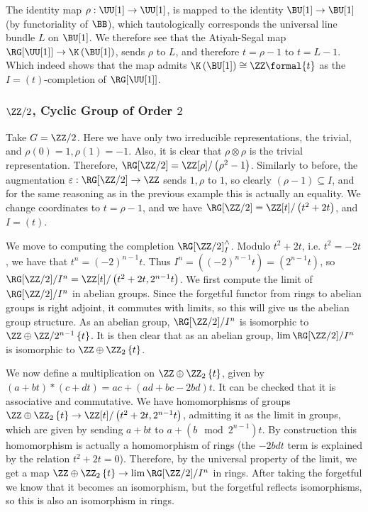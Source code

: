 The identity map $\rho: \UU[1] \to \UU[1]$, is mapped to the identity $\BU[1] \to \BU[1]$ (by functoriality of $\BB$), which tautologically corresponds the universal line bundle $L$ on $\BU[1]$.
We therefore see that the Atiyah-Segal map $\RG[\UU[1]] \to \K\left(\BU[1]\right)$, sends $\rho$ to $L$, and therefore $t = \rho - 1$ to $t = L - 1$.
Which indeed shows that the map admits $\K\left(\BU[1]\right) \cong \ZZ\formal{t}$ as the $I = \left(t\right)$-completion of $\RG[\UU[1]]$.


\subsubsection{\texorpdfstring{$\ZZ/2$}{Z/2}, Cyclic Group of Order \texorpdfstring{$2$}{2}}

Take $G = \ZZ/2$.
Here we have only two irreducible representations, the trivial, and $\rho\left(0\right) = 1, \rho\left(1\right) = -1$.
Also, it is clear that $\rho \otimes \rho$ is the trivial representation.
Therefore, $\RG[\ZZ/2] = \ZZ[\rho]/\left(\rho^2-1\right)$.
Similarly to before, the augmentation $\varepsilon: \RG[\ZZ/2] \to \ZZ$ sends $1,\rho$ to $1$, so clearly $\left(\rho-1\right) \subseteq I$, and for the same reasoning as in the previous example this is actually an equality.
We change coordinates to $t = \rho-1$, and we have $\RG[\ZZ/2] = \ZZ[t]/\left(t^2+2t\right)$, and $I = \left(t\right)$.

We move to computing the completion $\RG[\ZZ/2]_I^\wedge$.
Modulo $t^2+2t$, i.e. $t^2 = -2t$, we have that $t^n = \left(-2\right)^{n-1} t$.
Thus $I^n = \left(\left(-2\right)^{n-1} t\right) = \left(2^{n-1} t\right)$, so $\RG[\ZZ/2]/I^n = \ZZ[t]/\left(t^2+2t, 2^{n-1} t\right)$.
We first compute the limit of $\RG[\ZZ/2]/I^n$ in abelian groups.
Since the forgetful functor from rings to abelian groups is right adjoint, it commutes with limits, so this will give us the abelian group structure.
As an abelian group, $\RG[\ZZ/2]/I^n$ is isomorphic to $\ZZ \oplus \ZZ/2^{n-1}\left\{t\right\}$.
It is then clear that as an abelian group, $\lim \RG[\ZZ/2]/I^n$ is isomorphic to $\ZZ \oplus \ZZ_2\left\{t\right\}$.

We now define a multiplication on $\ZZ \oplus \ZZ_2\left\{t\right\}$, given by $\left(a+bt\right) * \left(c+dt\right) = ac + (ad+bc-2bd)t$.
It can be checked that it is associative and commutative.
We have homomorphisms of groups $\ZZ \oplus \ZZ_2\left\{t\right\} \to \ZZ[t]/\left(t^2+2t, 2^{n-1} t\right)$, admitting it as the limit in groups, which are given by sending $a+bt$ to $a+\left(b \mod 2^{n-1}\right) t$.
By construction this homomorphism is actually a homomorphism of rings (the $-2bdt$ term is explained by the relation $t^2+2t = 0$).
Therefore, by the universal property of the limit, we get a map $\ZZ \oplus \ZZ_2\left\{t\right\} \to \lim \RG[\ZZ/2]/I^n$ in rings.
After taking the forgetful we know that it becomes an isomorphism, but the forgetful reflects isomorphisms, so this is also an isomorphism in rings.

